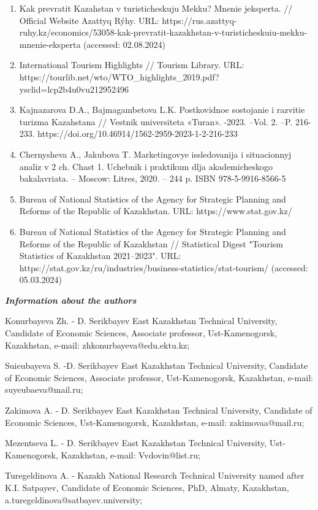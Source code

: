 \begin{enumerate}
  (accessed: 02.08.2024)
\item
  Kak prevratit\textquotesingle{} Kazahstan v turisticheskuju Mekku?
  Mnenie jeksperta. // Official Website Azattyq Rýhy. URL:
  https://rus.azattyq-ruhy.kz/economics/53058-kak-prevratit-kazakhstan-v-turisticheskuiu-mekku-mnenie-eksperta
  (accessed: 02.08.2024)
\item
  International Tourism Highlights // Tourism Library. URL:
  https://tourlib.net/wto/WTO\_highlights\_2019.pdf?ysclid=lcp2b4u0vu212952496
\item
  Kajnazarova D.A., Bajmagambetova L.K. Postkovidnoe sostojanie i
  razvitie turizma Kazahstana // Vestnik universiteta «Turan». -2023.
  --Vol. 2. --P. 216-233.
  https://doi.org/10.46914/1562-2959-2023-1-2-216-233
\item
  Chernysheva A., Jakubova T. Marketingovye issledovanija i situacionnyj
  analiz v 2 ch. Chast\textquotesingle{} 1. Uchebnik i praktikum dlja
  akademicheskogo bakalavriata. -- Moscow: Litres, 2020. -- 244 p. ISBN
  978-5-9916-8566-5
\item
  Bureau of National Statistics of the Agency for Strategic Planning and
  Reforms of the Republic of Kazakhstan. URL: https://www.stat.gov.kz/
\item
  Bureau of National Statistics of the Agency for Strategic Planning and
  Reforms of the Republic of Kazakhstan // Statistical Digest "Tourism
  Statistics of Kazakhstan 2021--2023". URL:
  https://stat.gov.kz/ru/industries/business-statistics/stat-tourism/
  (accessed: 05.03.2024)
\end{enumerate}

\emph{{\bfseries Information about the authors}}

Konurbayeva Zh. - D. Serikbayev East Kazakhstan Technical University,
Candidate of Economic Sciences, Associate professor, Ust-Kamenogorsk,
Kazakhstan, e-mail: zhkonurbayeva@edu.ektu.kz;

Suieubayeva S. -D. Serikbayev East Kazakhstan Technical University,
Candidate of Economic Sciences, Associate professor, Ust-Kamenogorsk,
Kazakhstan, e-mail: suyeubaeva@mail.ru;

Zakimova A. - D. Serikbayev East Kazakhstan Technical University,
Candidate of Economic Sciences, Ust-Kamenogorsk, Kazakhstan, e-mail:
zakimovaa@mail.ru;

Mezentseva L. - D. Serikbayev East Kazakhstan Technical University,
Ust-Kamenogorsk, Kazakhstan, e-mail: Vvdovin@list.ru;

Turegeldinova A. - Kazakh National Research Technical University named
after K.I. Satpayev, Candidate of Economic Sciences, PhD, Almaty,
Kazakhstan, a.turegeldinova@satbayev.university;

